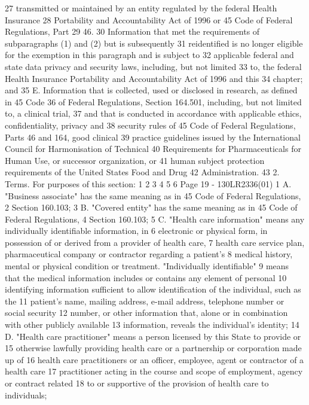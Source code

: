 27 transmitted or maintained by an entity regulated by the federal Health Insurance
28 Portability and Accountability Act of 1996 or 45 Code of Federal Regulations, Part
29 46.
30 Information that met the requirements of subparagraphs (1) and (2) but is subsequently
31 reidentified is no longer eligible for the exemption in this paragraph and is subject to
32 applicable federal and state data privacy and security laws, including, but not limited
33 to, the federal Health Insurance Portability and Accountability Act of 1996 and this
34 chapter; and
35 E. Information that is collected, used or disclosed in research, as defined in 45 Code
36 of Federal Regulations, Section 164.501, including, but not limited to, a clinical trial,
37 and that is conducted in accordance with applicable ethics, confidentiality, privacy and
38 security rules of 45 Code of Federal Regulations, Parts 46 and 164, good clinical
39 practice guidelines issued by the International Council for Harmonisation of Technical
40 Requirements for Pharmaceuticals for Human Use, or successor organization, or
41 human subject protection requirements of the United States Food and Drug
42 Administration.
43 2. Terms. For purposes of this section:
1
2
3
4
5
6
Page 19 - 130LR2336(01)
1 A. "Business associate" has the same meaning as in 45 Code of Federal Regulations,
2 Section 160.103;
3 B. "Covered entity" has the same meaning as in 45 Code of Federal Regulations,
4 Section 160.103;
5 C. "Health care information" means any individually identifiable information, in
6 electronic or physical form, in possession of or derived from a provider of health care,
7 health care service plan, pharmaceutical company or contractor regarding a patient's
8 medical history, mental or physical condition or treatment. "Individually identifiable"
9 means that the medical information includes or contains any element of personal
10 identifying information sufficient to allow identification of the individual, such as the
11 patient's name, mailing address, e-mail address, telephone number or social security
12 number, or other information that, alone or in combination with other publicly available
13 information, reveals the individual's identity;
14 D. "Health care practitioner" means a person licensed by this State to provide or
15 otherwise lawfully providing health care or a partnership or corporation made up of
16 health care practitioners or an officer, employee, agent or contractor of a health care
17 practitioner acting in the course and scope of employment, agency or contract related
18 to or supportive of the provision of health care to individuals;
